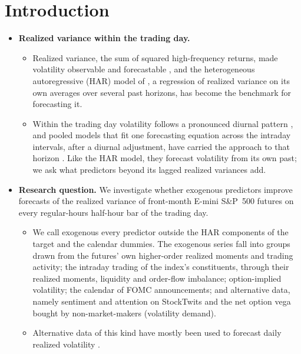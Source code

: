 

\section{Introduction}
\label{sec:rh_intro}
\begin{itemize}
\item \textbf{Realized variance within the trading day.}
  \begin{itemize}
  \item Realized variance, the sum of squared high-frequency returns, made volatility observable and forecastable
    \citep{AndersenBollerslevDieboldLabys2003, BarndorffNielsenShephard2002}, and the heterogeneous autoregressive
    (HAR) model of \citet{Corsi2009}, a regression of realized variance on its own averages over several past
    horizons, has become the benchmark for forecasting it.
  \item Within the trading day volatility follows a pronounced diurnal pattern \citep{AndersenBollerslev1997}, and
    pooled models that fit one forecasting equation across the intraday intervals, after a diurnal adjustment, have
    carried the approach to that horizon \citep{EngleSokalska2012,ZhangZhangCucuringuQian2024}. Like the HAR model,
    they forecast volatility from its own past; we ask what predictors beyond its lagged realized variances add.
  \end{itemize}
\item \textbf{Research question.} We investigate whether exogenous predictors improve forecasts of the
  realized variance of front-month E-mini S\&P~500 futures on every regular-hours half-hour bar of the trading day.
  \begin{itemize}
  \item We call exogenous every predictor outside the HAR components of the target and the calendar dummies. The
    \rhdmNSeriesPooled{} exogenous series fall into \bkNBuckets{} groups drawn from the futures' own higher-order
    realized moments and trading activity; the intraday trading of the index's constituents, through their realized
    moments, liquidity and order-flow imbalance; option-implied volatility; the calendar of FOMC announcements; and
    alternative data, namely sentiment and attention on StockTwits and the net option vega bought by
    non-market-makers (volatility demand).
  \item Alternative data of this kind have mostly been used to forecast daily realized volatility
    \citep{AudrinoSigristBallinari2020,CaporinPoli2017}.

\end{itemize}
\end{itemize}
